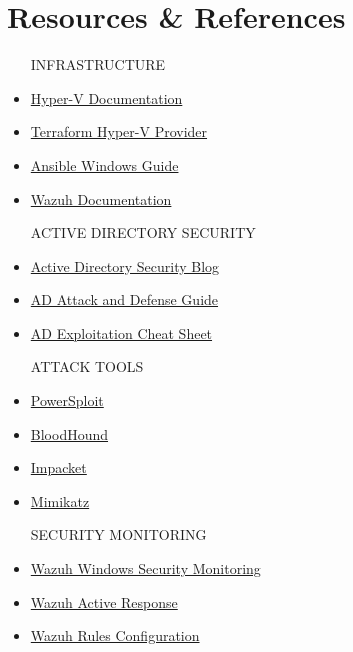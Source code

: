 \documentclass[11pt,a4paper]{article}
\begin{document}
\section{Resources \& References}
\begin{itemize}
    \item[INFRASTRUCTURE]
    \item \href{https://learn.microsoft.com/en-us/virtualization/hyper-v-on-windows/}{Hyper-V Documentation}
    \item \href{https://www.terraform.io/docs/providers/hyperv/}{Terraform Hyper-V Provider}
    \item \href{https://docs.ansible.com/ansible/latest/os_guide/windows_usage.html}{Ansible Windows Guide}
    \item \href{https://documentation.wazuh.com/current/index.html}{Wazuh Documentation}

    \item[ACTIVE DIRECTORY SECURITY]
    \item \href{https://adsecurity.org/}{Active Directory Security Blog}
    \item \href{https://github.com/infosecn1nja/AD-Attack-Defense}{AD Attack and Defense Guide}
    \item \href{https://github.com/S1ckB0y1337/Active-Directory-Exploitation-Cheat-Sheet}{AD Exploitation Cheat Sheet}

    \item[ATTACK TOOLS]
    \item \href{https://github.com/PowerShellMafia/PowerSploit}{PowerSploit}
    \item \href{https://github.com/BloodHoundAD/BloodHound}{BloodHound}
    \item \href{https://github.com/SecureAuthCorp/impacket}{Impacket}
    \item \href{https://github.com/gentilkiwi/mimikatz}{Mimikatz}

    \item[SECURITY MONITORING]
    \item \href{https://documentation.wazuh.com/current/learning-wazuh/detect-windows-evading.html}{Wazuh Windows Security Monitoring}
    \item \href{https://documentation.wazuh.com/current/user-manual/capabilities/active-response/}{Wazuh Active Response}
    \item \href{https://documentation.wazuh.com/current/user-manual/ruleset/ruleset-xml-syntax.html}{Wazuh Rules Configuration}
\end{itemize}
\end{document}
